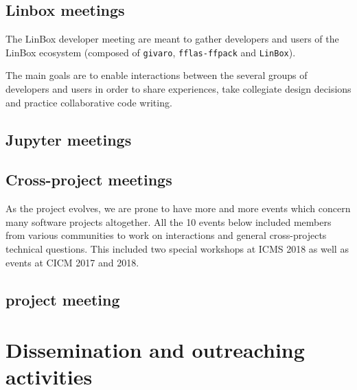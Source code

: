 \documentclass{deliverablereport}
\begin{document}
\subsection{Linbox meetings}

The LinBox developer meeting are meant to gather developers and users of the
LinBox ecosystem (composed of \texttt{givaro}, \texttt{fflas-ffpack} and
\texttt{LinBox}).

The main goals are to enable interactions between the several groups of
developers and users in order to share experiences, take collegiate design
decisions and practice collaborative code writing.





\subsection{Jupyter meetings}




\subsection{Cross-project meetings}

As the project evolves, we are prone to have more and more events which 
concern many software projects altogether. All the 10 events below
included members from various communities to work on interactions and
general cross-projects technical questions. This included two special
workshops at ICMS 2018 as well as events at CICM 2017 and 2018.









\subsection{\ODK project meeting}





\section{Dissemination and outreaching activities}
\end{document}
